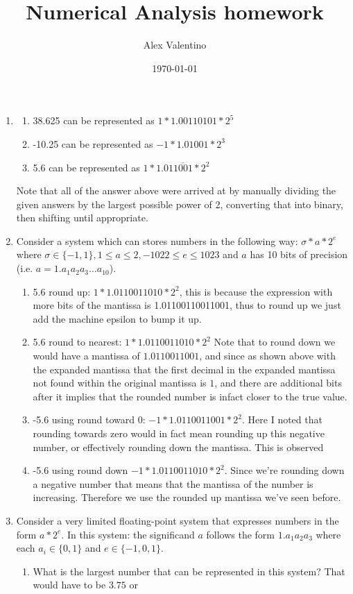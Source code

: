 \documentclass[12pt, letterpaper]{article}
\date{\today}
\author{Alex Valentino}
\title{Numerical Analysis homework}
\begin{document}
\begin{enumerate}
	\item 
	\begin{enumerate}
		\item 38.625 can be represented as $1*1.00110101*2^5$
		\item -10.25 can be represented as $-1*1.01001*2^3$
		\item 5.6 can be represented as $1*1.01\overline{1001}*2^2$
	\end{enumerate}
	Note that all of the answer above were arrived at by manually dividing the given answers by the largest possible power of 2, converting that
	into binary, then shifting until appropriate.  
	\item Consider a system which can stores numbers in the following way: $\sigma * a * 2^e$ where 
	$\sigma \in \{-1,1\}, 1 \leq a \leq 2, -1022 \leq e \leq 1023$ and $a$ has 10 bits of precision (i.e. 
	$a = 1.a_1a_2a_3\ldots a_{10}$). 
	\begin{enumerate}
		\item 5.6 round up: $1 * 1.0110011010 *2^2$, this is because the expression with more bits of the mantissa is 1.01100110011001, thus 
		to round up we just add the machine epsilon to bump it up. 
		\item 5.6 round to nearest: $1 * 1.0110011010 *2^2$ Note that to round down we would have a mantissa of $1.0110011001$, and since 
		as shown above with the expanded mantissa that the first decimal in the expanded mantissa not found within the original mantissa is $1$, and there are additional bits after it implies that the rounded number is infact closer to the true value.
		\item -5.6 using round toward 0: $-1 * 1.0110011001 *2^2$.  Here I noted that rounding towards zero would in fact mean rounding up this negative number, or effectively rounding down the mantissa.  This is observed
		\item -5.6 using round down $-1 * 1.0110011010 *2^2$.  Since we're rounding down a negative number that means that the mantissa of the number is increasing.  Therefore we use the rounded up mantissa we've seen before.  
	\end{enumerate}
	\item Consider a very limited floating-point system that expresses numbers in the form $a*2^e$.  
	In this system: the significand $a$ follows the form $1.a_1a_2a_3$ where each $a_i \in \{0,1\}$ and
	$e \in \{-1,0,1\}$.  
	\begin{enumerate}
		\item What is the largest number that can be represented in this system?  That would have to be $3.75$ or 

\end{enumerate}
\end{enumerate}
\end{document}
